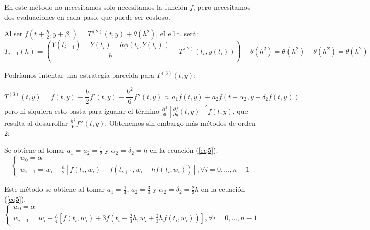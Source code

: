 \begin{remark}
    En este método no necesitamos solo necesitamos la función $f$, pero necesitamos dos evaluaciones en cada paso, que puede ser costoso.
\end{remark}

\begin{remark}
    Al ser $ f(t+\frac{h}{2}, y+\beta_1)=T^{(2)}(t,y)+\theta(h^2) $, el e.l.t. será:
    $$
    T_{i+1}(h)= \left(\frac{Y(t_{i+1})-Y(t_i)-h\phi(t_i,Y(t_i))}{h} - T^{(2)}(t_i, y(t_i))\right) - \theta(h^2)
    =\theta(h^2)- \theta(h^2)
    =\theta(h^2)
    $$
\end{remark}

Podríamos intentar una estrategia parecida para $T^{(3)}(t,y)$:

\begin{equation}
\label{eq5}
T^{(3)}(t,y) = f(t,y) + \frac{h}{2}f'(t,y) + \frac{h^2}{6}f''(t,y) \approx a_1f(t,y) + a_2f(t+\alpha_2, y+\delta_2f(t,y))
\end{equation}
pero ni siquiera esto basta para igualar el término $ \frac{h^2}{6}\left[ \frac{\partial f}{\partial y}(t,y)\right]^2f(t,y)$, que resulta al desarrollar $\frac{h^2}{6}f''(t,y)$.
Obtenemos sin embargo más métodos de orden 2:

\begin{definition}
Se obtiene al tomar $a_1 = a_2 = \frac{1}{2}$ y $\alpha_2 = \delta_2 = h$ en la ecuación  (\ref{eq5}).
\begin{equation}
\begin{cases}
    w_0=\alpha \\
    w_{i+1}=w_i + \frac{h}{2}\left[f(t_i, w_i) + f(t_{i+1}, w_i+hf(t_i,w_i))\right]  , \forall i=0,\dots, n-1
\end{cases}
\end{equation}

\end{definition}

\begin{definition}
Este método se obtiene al tomar $a_1 = \frac{1}{4}$, $a_2 = \frac{3}{4}$ y $\alpha_2 = \delta_2 = \frac{2}{3}h$ en la ecuación  (\ref{eq5}).
\begin{equation}
\begin{cases}
    w_0=\alpha \\
    w_{i+1}=w_i + \frac{h}{4}\left[f(t_i, w_i) + 3f(t_i + \frac{2}{3}h, w_i+\frac{2}{3}hf(t_i,w_i))\right] , \forall i=0,\dots, n-1
\end{cases}
\end{equation}

\end{definition}

